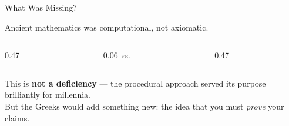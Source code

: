 \begin{frame}{What Was Missing?}

  \begin{center}
    {\large Ancient mathematics was \alert{computational}, not \alert{axiomatic}.}
  \end{center}

  \vspace{0.5em}
  \begin{columns}[T]
    \begin{column}{0.47\textwidth}
    \end{column}

    \begin{column}{0.06\textwidth}
      \centering\vspace{1cm}
      {\Large\textcolor{gray}{vs.}}
    \end{column}

    \begin{column}{0.47\textwidth}
    \end{column}
  \end{columns}

  \vspace{0.8em}
  \begin{center}
    {\small This is \textbf{not a deficiency} --- the procedural approach served its purpose
    brilliantly for millennia.\\
    But the Greeks would add something new: the idea that you must \emph{prove} your claims.}
  \end{center}

\end{frame}

